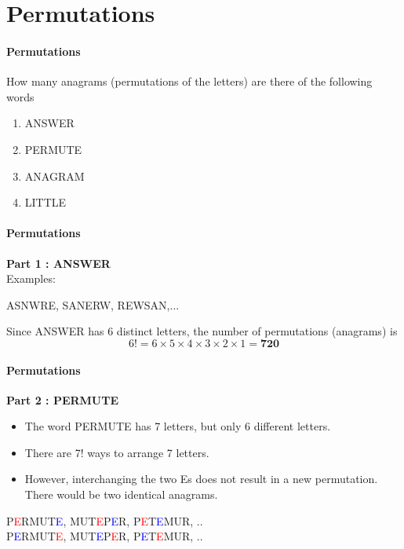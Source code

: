 \documentclass[]{report}
\begin{document}
\chapter{Permutations}

\begin{frame}
\frametitle{Permutations}
\Large
\vspace{-2cm}
How many anagrams (permutations of the letters) are there of the following words
\begin{enumerate}
\item ANSWER
\item PERMUTE
\item ANAGRAM
\item LITTLE
\end{enumerate}

\end{frame}
\begin{frame}
\frametitle{Permutations}
\Large
\vspace{-2cm}
\textbf{Part 1 : ANSWER}\\
Examples:
\begin{center}
ASNWRE,\;
SANERW,\;
REWSAN,\;...
\end{center}

Since ANSWER has 6 distinct letters, the number of permutations (anagrams) is
\LARGE
\[6! = 6\times 5 \times 4 \times 3 \times 2\times 1 = \boldsymbol{720} \]
\end{frame}
\begin{frame}
\frametitle{Permutations}
\Large
\vspace{-0.3cm}
\textbf{Part 2 : PERMUTE}\\
\begin{itemize}
\item The word PERMUTE has 7 letters, but only 6 different letters. 
\item There are 7! ways to arrange 7 letters.
\item However, interchanging the two Es does not result in a new permutation. There would be two identical anagrams.
\end{itemize}

\begin{center}
P\textcolor{red}{E}RMUT\textcolor{blue}{E}, \; MUT\textcolor{red}{E}P\textcolor{blue}{E}R, \; P\textcolor{red}{E}T\textcolor{blue}{E}MUR,\; ..\\
P\textcolor{blue}{E}RMUT\textcolor{red}{E}, \; MUT\textcolor{blue}{E}P\textcolor{red}{E}R, \; P\textcolor{blue}{E}T\textcolor{red}{E}MUR,\; ..
\end{center}
\end{frame}
\end{document}
